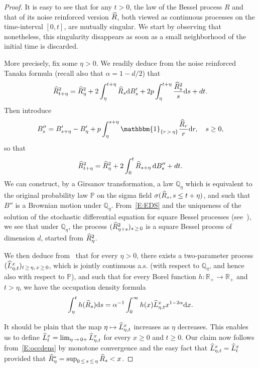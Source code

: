 \documentclass[10pt]{amsart}
\theoremstyle{definition}\newtheorem{defi}[theo]{Definition}\newtheorem{rema}[theo]{Remark}\newtheorem{exam}[theo]{Example}\newtheorem{exem}[theo]{Example}\newtheorem{nota}[theo]{Notation}
\newcommand{\ind}[1]{\mathbbm{1}_{\left\{#1\right\}}}
\renewcommand{\hat}[1]{\widehat{#1}}
\newcommand{\dd}{\mathrm{d}}
\newcommand{\Q}{\mathbb{Q}}
\renewcommand{\P}{\mathbb{P}}
\newcommand{\R}{\mathbb{R}}
\let\oldhat\hat
\renewcommand*{\hat}[1]{\mathchoice{\widehat{#1}}{\widehat{#1}}{\oldhat{#1}}{\oldhat{#1}}}
\begin{document}
\begin{proof}
It is easy to see that for any $t>0$, the law of the Bessel process $R$ and that of its noise reinforced version $\hat R$, both viewed as continuous processes on the time-interval $[0,t]$, are mutually singular. We start by observing that nonetheless, this singularity disappears as soon as a small neighborhood of the initial time is discarded.

More precisely, fix some $\eta>0$. We readily deduce from the noise reinforced Tanaka formula (recall also that $\alpha=1-d/2$) that
\[
\hat R_{t+\eta}^2= \hat R^2_{\eta} + 2\int_{\eta}^{t+\eta} \hat R_s \dd B'_s + 2p \int_{\eta}^{t+\eta} \frac{\hat R^2_s}{s} \dd s + dt.
\]
Then introduce
\[
B''_s= B'_{s+\eta} - B'_{\eta} + p\int_{\eta}^{s+\eta} \ind{r\,>\,\eta} \frac{\hat R_r}{r} \dd r,\quad s\geq 0,
\]
so that
\begin{equation}\label{E:EDS}
\hat R_{t+\eta}^2= \hat R^2_{\eta} + 2\int_{0}^t \hat R_{s+\eta}\, \dd B''_s + d t.
\end{equation}
We can construct, by a Girsanov transformation, a law $\Q_{\eta}$ which is equivalent to the original probability law $\P$ on the sigma field $\sigma(\hat R_s, s\leq t+\eta)$, and such that $B''$ is a Brownian motion under $\Q_{\eta}$. From~\eqref{E:EDS} and the uniqueness of the solution of the stochastic differential equation for square Bessel processes (see~\cite[Section~XI.1]{RY}), we see that under $\Q_{\eta}$, the process $(\hat R_{\eta+s}^2)_{s\,\geq\,0}$ is a square Bessel process of dimension $d$, started from $\hat R_{\eta}^2$.

We then deduce from~\cite[Proposition~3.1]{DRVY} that for every $\eta>0$, there exists a two-parameter process $(\hat{L}^x_{\eta,t})_{t\,\geq\,\eta,\,x\,\geq\,0}$, which is jointly continuous a.s. (with respect to $\Q_{\eta}$, and hence also with respect to $\P$), and such that for every Borel function $h: \R_+\to \R_+$ and $t>\eta$, we have the occupation density formula
\begin{equation}\label{E:occdens}
\int_{\eta}^t h(\hat R_s) \dd s = \alpha^{-1} \int_0^{\infty} h(x) \hat{L}^x_{\eta,t} x^{1-2\alpha} \dd x.
\end{equation}

It should be plain that the map $\eta\mapsto \hat{L}^x_{\eta,t}$ increases as $\eta$ decreases. This enables us to define $ \hat{L}^x_{t} = \lim_{\eta\,\to\,0+} \hat{L}^x_{\eta,t}$ for every $x\geq 0$ and $t\geq 0$. Our claim now follows from~\eqref{E:occdens} by monotone convergence and the easy fact that $\hat{L}^x_{\eta,t}=\hat{L}^x_{t}$ provided that $\hat R^*_{\eta}=\sup_{0\,\leq\,s\,\leq\,\eta} \hat R_s <x$.
\end{proof}
\end{document}
